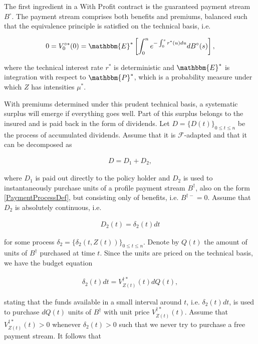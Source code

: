 \documentclass{book}
\newcommand{\1}[1]{\mathbbm{1}_{\left\lbrace #1 \right\rbrace}}
\newcommand{\expecStar}[1][def]{\mathbbm{E}^* \left[ #1 \right]}
\theoremstyle{break}
\theoremstyle{remark}
\numberwithin{equation}{section}
\begin{document}
The first ingredient in a With Profit contract is the guaranteed payment stream $B^\circ$. The payment stream comprises both benefits and premiums, balanced such that the equivalence principle is satisfied on the technical basis, i.e.

\begin{align*}
0 = V_0^{\circ*}(0) = \expecStar[\int_0^n e^{-\int_0^s r^*(u) du} dB^\circ(s)],
\end{align*}

where the technical interest rate $r^*$ is deterministic and $\mathbbm{E}^*$ is integration with respect to $\mathbbm{P}^*$, which is a probability measure under which $Z$ has intensities $\mu^*$.

With premiums determined under this prudent technical basis, a systematic surplus will emerge if everything goes well. Part of this surplus belongs to the insured and is paid back in the form of dividends. Let $D = \{ D(t) \}_{0 \leq t \leq n}$ be the process of accumulated dividends. Assume that it is $\mathcal{F}$-adapted and that it can be decomposed as

\begin{align*}
D = D_1 + D_2,
\end{align*}

where $D_1$ is paid out directly to the policy holder and $D_2$ is used to instantaneously purchase units of a profile payment stream $B^\dagger$, also on the form \ref{PaymentProcessDef}, but consisting only of benefits, i.e. $B^{\dagger -}=0$. Assume that $D_2$ is absolutely continuous, i.e.

\begin{align*}
D_2(t) = \delta_2(t) dt
\end{align*}

for some process $\delta_2 = \{ \delta_2(t,Z(t)) \}_{0 \leq t \leq n}$. Denote by $Q(t)$ the amount of units of $B^\dagger$ purchased at time $t$. Since the units are priced on the technical basis, we have the budget equation

\begin{align*}
\delta_2(t) dt = V_{Z(t)}^{\dagger*}(t) dQ(t),
\end{align*}

stating that the funds available in a small interval around $t$, i.e. $\delta_2(t) dt$, is used to purchase $dQ(t)$ units of $B^\dagger$ with unit price $V_{Z(t)}^{\dagger*}(t)$. Assume that $V_{Z(t)}^{\dagger*}(t)>0$ whenever $\delta_2(t)>0$ such that we never try to purchase a free payment stream. It follows that
\end{document}
